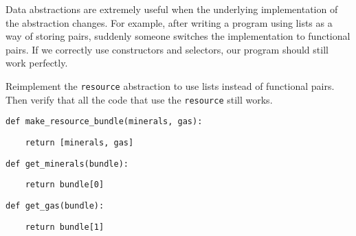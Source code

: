 \question Data abstractions are extremely useful when the underlying
implementation of the abstraction changes. For example, after writing a program
using lists as a way of storing pairs, suddenly someone switches the
implementation to functional pairs. If we correctly use constructors and
selectors, our program should still work perfectly.

Reimplement the {\tt resource} abstraction to use lists instead of functional
pairs. Then verify that all the code that use the {\tt resource} still works.

\begin{lstlisting}
def make_resource_bundle(minerals, gas):
\end{lstlisting}
\begin{solution}[0.4in]
\begin{lstlisting}
    return [minerals, gas]
\end{lstlisting}
\end{solution}

\begin{lstlisting}
def get_minerals(bundle):
\end{lstlisting}
\begin{solution}[0.4in]
\begin{lstlisting}
    return bundle[0]
\end{lstlisting}
\end{solution}

\begin{lstlisting}
def get_gas(bundle):
\end{lstlisting}
\begin{solution}[0.3in]
\begin{lstlisting}
    return bundle[1]
\end{lstlisting}
\end{solution}
